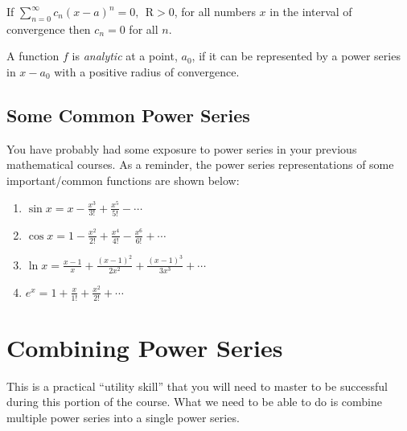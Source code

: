\begin{definition}
If $\sum_{n=0}^{\infty}c_n(x-a)^n=0, \ \ \text{R}>0$, for all numbers $x$ in the interval of convergence then $c_n=0$ for all $n$.
\label{def:ps-identity-property}
\end{definition}


\begin{definition}
A function $f$ is \emph{analytic} at a point, $a_0$, if it can be represented by a power series in $x-a_0$ with a positive radius of convergence.
\end{definition}

\subsection{Some Common Power Series}
You have probably had some exposure to power series in your previous mathematical courses.  As a reminder, the power series representations of some important/common functions are shown below:

\begin{enumerate}

\item $\sin{x} = x - \frac{x^3}{3!} + \frac{x^5}{5!} - \cdots$

\item $\cos{x} = 1 - \frac{x^2}{2!} + \frac{x^4}{4!} - \frac{x^6}{6!} + \cdots$

\item $\ln{x} = \frac{x-1}{x} + \frac{(x-1)^2}{2x^2} + \frac{(x-1)^3}{3x^3} + \cdots$ 

\item $e^x = 1 + \frac{x}{1!} + \frac{x^2}{2!} + \cdots$
\end{enumerate}


\section{Combining Power Series}
This is a practical ``utility skill'' that you will need to master to be successful during this portion of the course.  What we need to be able to do is combine multiple power series into a single power series.  

